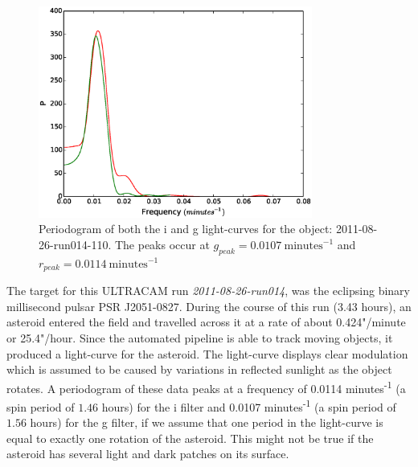 \begin{figure}
  \center
  \includegraphics[width=90mm]{images/2011-08-26-run014-110-pgram-bin4.eps} 
  \caption{Periodogram of both the i and g light-curves for the object: 2011-08-26-run014-110. The peaks occur at $g_{peak} = 0.0107 \ \mbox{minutes}^{-1}$ and  $r_{peak} = 0.0114\ \mbox{minutes}^{-1}$ }
  \label{fig:asteroidpgram}
\end{figure}

  
The target for this ULTRACAM run \emph{2011-08-26-run014}, was the eclipsing binary millisecond pulsar PSR J2051-0827. During the course of this run (3.43 hours), an asteroid entered the field and travelled across it at a rate of about 0.424"/minute or 25.4"/hour. Since the automated pipeline is able to track moving objects, it produced a light-curve for the asteroid. The light-curve displays clear modulation which is assumed to be caused by variations in reflected sunlight as the object rotates. A periodogram of these data peaks at a frequency of 0.0114 minutes\textsuperscript{-1} (a spin period of $1.46$ hours) for the i filter and 0.0107 minutes\textsuperscript{-1} (a spin period of $1.56$ hours) for the g filter, if we assume that one period in the light-curve is equal to exactly one rotation of the asteroid. This might not be true if the asteroid has several light and dark patches on its surface. 

